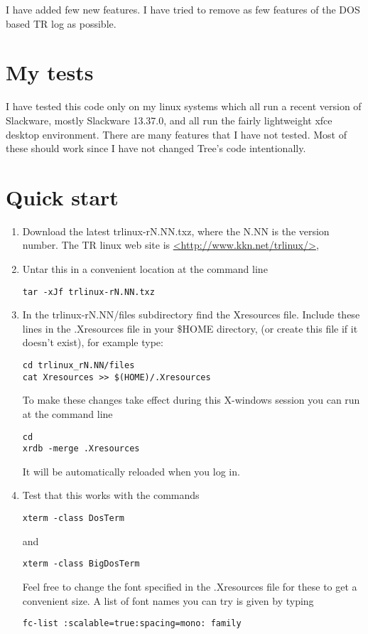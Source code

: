 \documentclass[12pt]{article}
\begin{document}
I have
added few new
features. I have tried to remove as few features of the DOS based
TR log as possible. 

\section{My tests}
I have tested this code only on my linux systems which all run a recent
version of Slackware, mostly Slackware 13.37.0, and all run the fairly
lightweight xfce desktop environment. There are many features that I 
have not tested. Most of these should work since I have not changed Tree's
code intentionally.

\section{Quick start}
\begin{enumerate}
\item
Download the latest trlinux-rN.NN.txz, where the N.NN is the version number.
The TR linux web site is \url{<http://www.kkn.net/trlinux/>},
\item
Untar this in a convenient location at the command line
\begin{verbatim}
tar -xJf trlinux-rN.NN.txz
\end{verbatim}
\item
In the trlinux-rN.NN/files subdirectory find the Xresources file. Include
these lines in the .Xresources file in your \$HOME directory, (or
create this file if it doesn't exist), for example type:
\begin{verbatim}
cd trlinux_rN.NN/files
cat Xresources >> $(HOME)/.Xresources
\end{verbatim}
To make these changes take effect during this X-windows session
you can run at the command line
\begin{verbatim}
cd
xrdb -merge .Xresources
\end{verbatim}
It will be automatically reloaded when you log in.
\item
Test that this works with the commands
\begin{verbatim}
xterm -class DosTerm
\end{verbatim}
and
\begin{verbatim}
xterm -class BigDosTerm
\end{verbatim}
Feel free to change the font
specified in the .Xresources file for these
to get a convenient size. A list of font names you can try is given by typing
\begin{verbatim}
fc-list :scalable=true:spacing=mono: family
\end{verbatim}


\end{enumerate}
\end{document}
